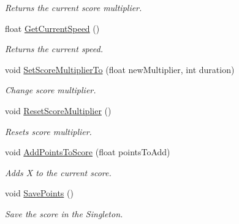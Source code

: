\begin{DoxyCompactItemize}
\begin{DoxyCompactList}\small\item\em Returns the current score multiplier. \end{DoxyCompactList}\item 
\mbox{\label{class_a_user_interface_manager_ab204b19e791bb6df7513e7cd72fe712a}} 
float \mbox{\hyperlink{class_a_user_interface_manager_ab204b19e791bb6df7513e7cd72fe712a}{Get\+Current\+Speed}} ()
\begin{DoxyCompactList}\small\item\em Returns the current speed. \end{DoxyCompactList}\item 
\mbox{\label{class_a_user_interface_manager_a92bafd4cd76cc242921860d784799bd3}} 
void \mbox{\hyperlink{class_a_user_interface_manager_a92bafd4cd76cc242921860d784799bd3}{Set\+Score\+Multiplier\+To}} (float new\+Multiplier, int duration)
\begin{DoxyCompactList}\small\item\em Change score multiplier. \end{DoxyCompactList}\item 
\mbox{\label{class_a_user_interface_manager_ad0145ad451603ce045b9665fdadf5be4}} 
void \mbox{\hyperlink{class_a_user_interface_manager_ad0145ad451603ce045b9665fdadf5be4}{Reset\+Score\+Multiplier}} ()
\begin{DoxyCompactList}\small\item\em Resets score multiplier. \end{DoxyCompactList}\item 
void \mbox{\hyperlink{class_a_user_interface_manager_a9561409c4db7eb127ae67ea03036725c}{Add\+Points\+To\+Score}} (float points\+To\+Add)
\begin{DoxyCompactList}\small\item\em Adds X to the current score. \end{DoxyCompactList}\item 
\mbox{\label{class_a_user_interface_manager_a0a5b197b438c541a0b88bede9f64ad52}} 
void \mbox{\hyperlink{class_a_user_interface_manager_a0a5b197b438c541a0b88bede9f64ad52}{Save\+Points}} ()
\begin{DoxyCompactList}\small\item\em Save the score in the Singleton. \end{DoxyCompactList}\item 

\end{DoxyCompactItemize}

